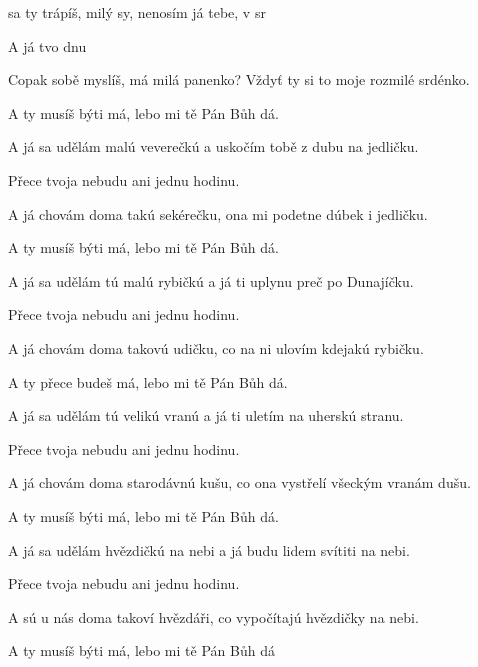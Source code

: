 

\zs
{} sa ty trápíš,  milý sy, nenosím já tebe,  v sr

A já tvo  dnu 
\ks

\zs
Copak sobě myslíš, má milá panenko?  Vždyť ty si to moje rozmilé srdénko.

A ty musíš býti má, lebo mi tě Pán Bůh dá.
\ks

\zs
A já sa udělám malú veverečkú a uskočím tobě z dubu na jedličku.

Přece tvoja nebudu ani jednu hodinu.
\ks

\zs
A já chovám doma takú sekérečku, ona mi podetne dúbek i jedličku.

A ty musíš býti má, lebo mi tě Pán Bůh dá.
\ks

\zs
A já sa udělám tú malú rybičkú a já ti uplynu preč po Dunajíčku.

Přece tvoja nebudu ani jednu hodinu.
\ks

\zs
A já chovám doma takovú udičku, co na ni ulovím kdejakú rybičku.

A ty přece budeš má, lebo mi tě Pán Bůh dá.
\ks

\zr
{}     
\kr

\zs
A já sa udělám tú velikú vranú a já ti uletím na uherskú stranu.

Přece tvoja nebudu ani jednu hodinu.
\ks

\zs
A já chovám doma starodávnú kušu, co ona vystřelí všeckým vranám dušu.

A ty musíš býti má, lebo mi tě Pán Bůh dá.
\ks

\zs
A já sa udělám hvězdičkú na nebi a já budu lidem svítiti na nebi.

Přece tvoja nebudu ani jednu hodinu.
\ks

\zs
A sú u nás doma takoví hvězdáři, co vypočítajú hvězdičky na nebi.

A ty musíš býti má, lebo mi tě Pán Bůh dá
\ks

\zr
{}      ~~
     
\kr

\kp







